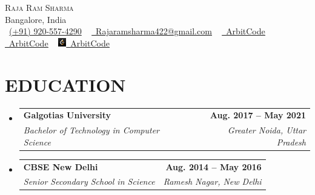 \documentclass[letterpaper,11pt]{article}
\makeatletter
\newcommand{\resumeSubheading}[4]{
  \vspace{-2pt}\item
    \begin{tabular*}{1.0\textwidth}[t]{l@{\extracolsep{\fill}}r}
      \textbf{#1} & \textbf{\small #2} \\
      \textit{\small#3} & \textit{\small #4} \\
    \end{tabular*}\vspace{-7pt}
}
\newcommand{\resumeSubHeadingListStart}{\begin{itemize}[leftmargin=0.0in, label={}]}
\newcommand{\resumeSubHeadingListEnd}{\end{itemize}}
\makeatother
\begin{document}

\begin{center}
    {\Huge \scshape Raja Ram Sharma} \\ \vspace{1pt}
    Bangalore, India \\ \vspace{1pt}
    \small \raisebox{-0.1\height}\faPhone\ \href{tel:+919205574290}{(+91) 920-557-4290}
    ~ \href{mailto:Rajaramsharma422@gmail.com}{\raisebox{-0.2\height}\faEnvelope\  \underline{Rajaramsharma422@gmail.com}}
    ~ \href{https://linkedin.com/in/ArbitCode}{\raisebox{-0.2\height}\faLinkedin\ \underline{ArbitCode}}
    ~ \href{https://github.com/ArbitCode}{\raisebox{-0.2\height}\faGithub\ \underline{ArbitCode}}
    ~ \href{https://leetcode.com/ArbitCode}{\textbf{\includegraphics[height=10pt, width=10pt]{./img/leetcode.png}}\ \underline{ArbitCode}}
    \vspace{-8pt}
\end{center}


\section{EDUCATION}
  \resumeSubHeadingListStart
    \resumeSubheading
      {Galgotias University}{Aug. 2017 -- May 2021}
      {Bachelor of Technology in Computer Science}{Greater Noida, Uttar Pradesh}
  \resumeSubHeadingListEnd
  \resumeSubHeadingListStart
    \resumeSubheading
      {CBSE New Delhi}{Aug. 2014 -- May 2016}
      {Senior Secondary School in Science}{Ramesh Nagar, New Delhi}
  \resumeSubHeadingListEnd
\end{document}
